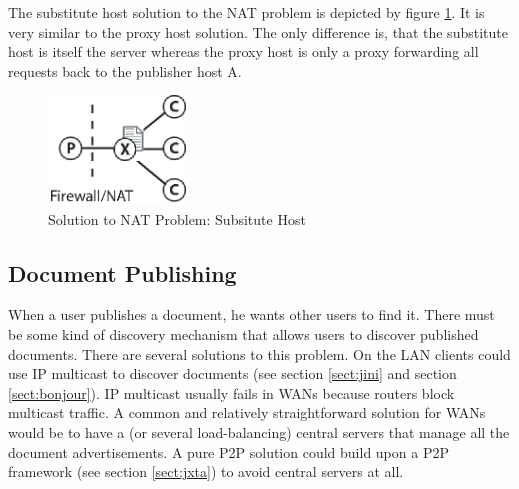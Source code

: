 The substitute host solution to the NAT problem is depicted by figure \ref{fig:substitute}. It is very similar to the proxy host solution. The only difference is, that the substitute host is itself the server whereas the proxy host is only a proxy forwarding all requests back to the publisher host A.

\begin{figure}[H]
 \centering
 \includegraphics[width=3.7cm,height=2.9cm]{../../images/net_substitute.eps}
 \caption{Solution to NAT Problem: Subsitute Host}
 \label{fig:substitute}
\end{figure}


\subsection{Document Publishing}
When a user publishes a document, he wants other users to find it. There must be some kind of discovery mechanism that allows users to discover published documents. There are several solutions to this problem. On the LAN clients could use IP multicast to discover documents (see section \ref{sect:jini} and section \ref{sect:bonjour}). IP multicast usually fails in WANs because routers block multicast traffic. A common and relatively straightforward solution for WANs would be to have a (or several load-balancing) central servers that manage all the document advertisements. A pure P2P solution could build upon a P2P framework (see section \ref{sect:jxta}) to avoid central servers at all.
